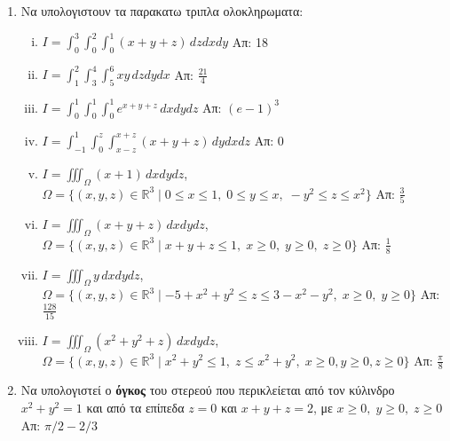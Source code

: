 


\pagestyle{askhseis}
\everymath{\displaystyle}



\begin{center}
  \minibox{\large\bf \textcolor{Col1}{Ασκήσεις Τριπλο Ολοκλήρωμα}}
\end{center}

\vspace{\baselineskip}

\begin{enumerate}
  \item Να υπολογιστουν τα παρακατω τριπλα ολοκληρωματα:
    \begin{enumerate}[i)]
      \item $ I=\int_{0}^{3}\!\!\int_{0}^{2}\!\!\int_{0}^{1}(x+y+z)\,dzdxdy $ 
        \hfill Απ: 18  
      \item $  I=\int_{1}^{2}\!\!\int_{3}^{4}\!\!\int_{5}^{6}xy\,dzdydx  $ 
        \hfill Απ: $ \frac{21}{4} $ 
      \item $ I=\int_{0}^{1}\!\!\int_{0}^{1}\!\!\int_{0}^{1}e^{x+y+z}\,dxdydz $ 
        \hfill Απ: $ (e-1)^{3} $
      \item $ I=\int_{-1}^{1}\!\!\int_{0}^{z}\!\int_{x-z}^{x+z}(x+y+z)\,dydxdz $ 
        \hfill Απ: 0  
      \item $ I=\iiint_{\Omega}(x+1)\,dxdydz $, \quad $ \Omega = \{(x,y,z)\in 
          \mathbb{R}^{3} \mid 0 \leq x \leq 1,\; 0 \leq y \leq x,\; -y^{2} \leq z 
        \leq x^{2} \}$ 
        \hfill Απ: $ \frac{3}{5} $ 
      \item $ I=\iiint_{\Omega} (x+y+z)\,dxdydz $, \quad $ \Omega= \{(x,y,z)\in 
        \mathbb{R}^{3} \mid x+y+z \leq 1,\; x \geq 0,\; y \geq 0,\; z \geq 0 \}  $ 
        \hfill Απ: $ \frac{1}{8} $ 
      \item $ I=\iiint_{\Omega} y\,dxdydz $, \quad $ \Omega = \{ (x,y,z) \in 
          \mathbb{R}^{3} \mid -5 + x^{2}+y^{2} \leq z \leq 3 - x^{2}-y^{2}, \; x 
        \geq 0, \; y \geq 0\}$ 
        \hfill Απ: $ \frac{128}{15} $  
      \item $ I = \iiint_{\Omega} (x^{2}+y^{2}+z) \,dxdydz $, \quad $\Omega = \{ 
        (x,y,z) \in \mathbb{R}^{3} \mid x^{2}+y^{2} \leq 1,\; z \leq x^{2}+y^{2}, 
      \; x \geq 0, y \geq 0, z \geq 0\} $ \hfill Απ: $ \frac{\pi}{8} $ 
    \end{enumerate}

  \item Να υπολογιστεί ο \textbf{όγκος} του στερεού που περικλείεται από τον κύλινδρο 
    $ x^{2}+y^{2}=1 $ και από τα επίπεδα $ z=0 $ και $ x+y+z=2 $, με 
    $ x \geq 0, \; y \geq 0, \; z \geq 0$ \hfill Απ: $ {\pi}/{2} - {2}/{3} $ 


\end{enumerate}
